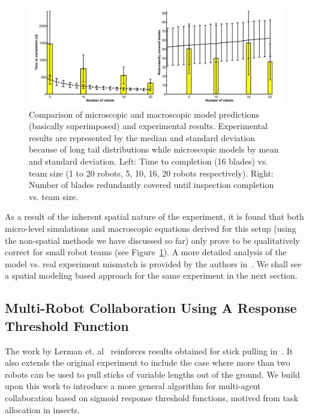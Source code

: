 \documentclass[Main.tex]{subfiles}
\begin{document}
\begin{figure}[!htb]
\centering\includegraphics[width=.75\textwidth]{assets/bladeRes.png}
\caption{Comparison of microscopic and macroscopic model predictions (basically superimposed) and experimental results. Experimental results are represented by the median and standard deviation because of long tail distributions while microscopic models by mean and standard deviation. Left: Time to completion (16 blades) vs. team size (1 to 20 robots, 5, 10, 16, 20 robots respectively). Right: Number of blades redundantly covered until inspection completion vs. team size.}\label{fig:bladeres}
\end{figure}

As a result of the inherent spatial nature of the experiment, it is found that both micro-level simulations and macroscopic equations derived for this setup (using the non-spatial methods we have discussed so far) only prove to be qualitatively correct for small robot teams (see Figure~\ref{fig:bladeres}). A more detailed analysis of the model vs. real experiment mismatch is provided by the authors in~\cite{Correll2006,Correll2008a}. We shall see a spatial modeling based approach for the same experiment in the next section.

\subsection{Multi-Robot Collaboration Using A Response Threshold Function}

The work by Lerman et. al~\cite{Lerman2001} reinforces results obtained for stick pulling in~\cite{Ijspeert2001,Martinoli1999,Martinoli1999a}. It also extends the original experiment to include the case where more than two robots can be used to pull sticks of variable lengths out of the ground. We build upon this work to introduce a more general algorithm for multi-agent collaboration based on sigmoid response threshold functions, motived from task allocation in insects.
\end{document}
